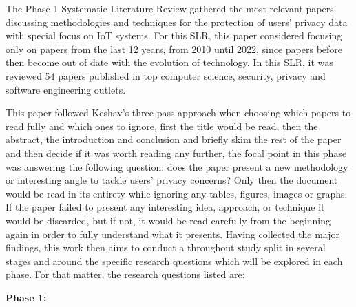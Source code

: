 \documentclass[conference]{IEEEtran}
\begin{document}
\par
The Phase 1 Systematic Literature Review gathered the most relevant papers
discussing methodologies and techniques for the protection of users' privacy
data with special focus on IoT systems. For this SLR, this paper considered
focusing only on papers from the last 12 years, from 2010 until 2022, since
papers before then become out of date with the evolution of technology.
In this SLR, it was reviewed 54 papers published in top computer science,
security, privacy and software engineering outlets.

This paper followed Keshav's three-pass approach \cite{KeshavHow} when choosing
which papers to read fully and which ones to ignore, first the title would
be read, then the abstract, the introduction and conclusion and briefly
skim the rest of the paper and then decide if it was worth reading any further,
the focal point in this phase was answering the following question: does
the paper present a new methodology or interesting angle to tackle users'
privacy concerns? Only then the document would be read in its entirety while
ignoring any tables, figures, images or graphs. If the paper failed to present
any interesting idea, approach, or technique it would be discarded, but
if not, it would be read carefully from the beginning again in order to
fully understand what it presents. Having collected the major findings,
this work then aims to conduct a throughout study split in several stages
and around the specific research questions which will be explored in each
phase. For that matter, the research questions listed are:

\vspace{5mm}
\textbf{Phase 1:} \\
\end{document}
